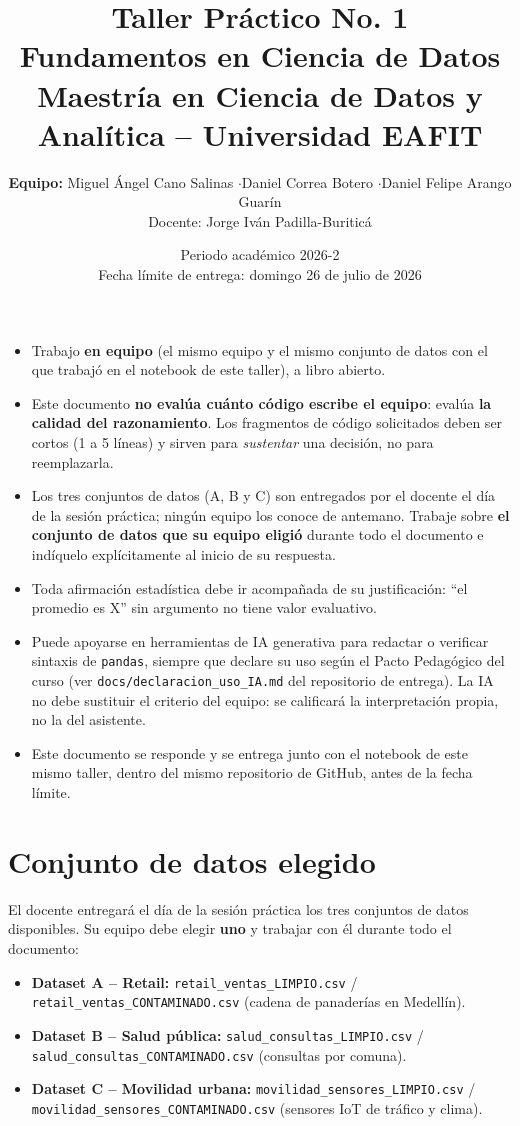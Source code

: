 \documentclass[11pt]{article}
\title{\vspace{-1.5cm}\textbf{Taller Práctico No. 1} \\[0.3em]
\large Fundamentos en Ciencia de Datos \\
\normalsize Maestría en Ciencia de Datos y Analítica -- Universidad EAFIT}
\author{\textbf{Equipo:} Miguel Ángel Cano Salinas \quad$\cdot$\quad Daniel Correa Botero \quad$\cdot$\quad Daniel Felipe Arango Guarín \\[0.4em]
\normalsize Docente: Jorge Iván Padilla-Buriticá}
\date{Periodo académico 2026-2 \\ Fecha límite de entrega: domingo 26 de julio de 2026}
\begin{document}
\maketitle
\vspace{-1cm}

\begin{contexto}
\begin{itemize}[leftmargin=1.3em]
  \item Trabajo \textbf{en equipo} (el mismo equipo y el mismo conjunto de datos con el que trabajó en el notebook de este taller), a libro abierto.
  \item Este documento \textbf{no evalúa cuánto código escribe el equipo}: evalúa \textbf{la calidad del razonamiento}. Los fragmentos de código solicitados deben ser cortos (1 a 5 líneas) y sirven para \emph{sustentar} una decisión, no para reemplazarla.
  \item Los tres conjuntos de datos (A, B y C) son entregados por el docente el día de la sesión práctica; ningún equipo los conoce de antemano. Trabaje sobre \textbf{el conjunto de datos que su equipo eligió} durante todo el documento e indíquelo explícitamente al inicio de su respuesta.
  \item Toda afirmación estadística debe ir acompañada de su justificación: ``el promedio es X'' sin argumento no tiene valor evaluativo.
  \item Puede apoyarse en herramientas de IA generativa para redactar o verificar sintaxis de \texttt{pandas}, siempre que declare su uso según el Pacto Pedagógico del curso (ver \texttt{docs/declaracion\_uso\_IA.md} del repositorio de entrega). La IA no debe sustituir el criterio del equipo: se calificará la interpretación propia, no la del asistente.
  \item Este documento se responde y se entrega junto con el notebook de este mismo taller, dentro del mismo repositorio de GitHub, antes de la fecha límite.
\end{itemize}
\end{contexto}

\section*{Conjunto de datos elegido}
El docente entregará el día de la sesión práctica los tres conjuntos de datos disponibles.
Su equipo debe elegir \textbf{uno} y trabajar con él durante todo el documento:

\begin{itemize}[leftmargin=1.3em]
  \item \textbf{Dataset A -- Retail:} \texttt{retail\_ventas\_LIMPIO.csv} / \texttt{retail\_ventas\_CONTAMINADO.csv} (cadena de panaderías en Medellín).
  \item \textbf{Dataset B -- Salud pública:} \texttt{salud\_consultas\_LIMPIO.csv} / \texttt{salud\_consultas\_CONTAMINADO.csv} (consultas por comuna).
  \item \textbf{Dataset C -- Movilidad urbana:} \texttt{movilidad\_sensores\_LIMPIO.csv} / \texttt{movilidad\_sensores\_CONTAMINADO.csv} (sensores IoT de tráfico y clima).
\end{itemize}
\end{document}
